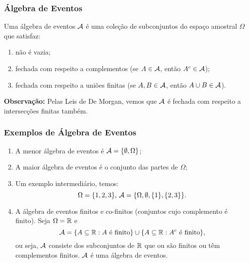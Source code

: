 %
\begin{frame}
\frametitle{\textbf{Álgebra de Eventos}}

\begin{definition}
Uma álgebra de eventos ${\cal A}$ é uma coleção de subconjuntos do espaço
amostral $\Omega$ que satisfaz:

\begin{enumerate}
\item não é vazia;

\item fechada com respeito a complementos (se $A\in{\cal A}$, então
$A^c\in{\cal A}$);

\item fechada com respeito a uniões finitas (se $A,B\in{\cal A}$, então $A\cup
B\in{\cal A}$).
\end{enumerate}
\end{definition}

{\bf Observação:} Pelas Leis de De Morgan, vemos que ${\cal A}$ é fechada com respeito a
intersecções finitas também.

\end{frame}
%
\begin{frame}
\frametitle{\textbf{Exemplos de Álgebra de Eventos}}


\begin{enumerate}
\item A menor álgebra de eventos é ${\cal A}=\{\emptyset,\Omega\}$;
\item A maior álgebra de eventos é o conjunto das partes de
$\Omega$;
\item Um exemplo intermediário, temos:
$$\Omega=\{1,2,3\}\mbox{, }{\cal A}=\{\Omega,\emptyset,\{1\},\{2,3\}\}.$$
\item A álgebra de eventos finitos e co-finitos (conjuntos cujo complemento é finito). Seja $\Omega=\mathbb{R}$ e
$${\cal A}=\{A\subseteq \mathbb{R}:A\mbox{ é finito}\}\cup\{A\subseteq \mathbb{R}:A^c\mbox{ é finito}\},$$
ou seja, ${\cal A}$ consiste dos subconjuntos de $\mathbb{R}$ que ou são finitos ou têm complementos finitos.
${\cal A}$ é uma álgebra de eventos.
\end{enumerate}
%
\end{frame}
%
